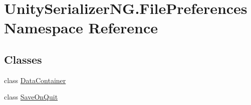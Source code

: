 \hypertarget{namespace_unity_serializer_n_g_1_1_file_preferences}{}\section{Unity\+Serializer\+N\+G.\+File\+Preferences Namespace Reference}
\label{namespace_unity_serializer_n_g_1_1_file_preferences}
\subsection*{Classes}
\begin{DoxyCompactItemize}
\item 
class \hyperlink{class_unity_serializer_n_g_1_1_file_preferences_1_1_data_container}{Data\+Container}
\item 
class \hyperlink{class_unity_serializer_n_g_1_1_file_preferences_1_1_save_on_quit}{Save\+On\+Quit}
\end{DoxyCompactItemize}

